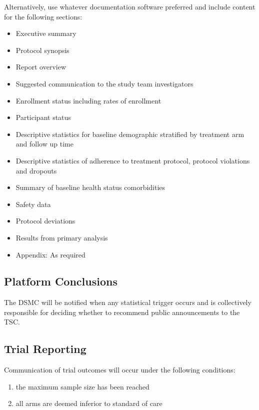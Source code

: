\documentclass[
]{article}
\providecommand{\tightlist}{%
  \setlength{\itemsep}{0pt}\setlength{\parskip}{0pt}}
\begin{document}
Alternatively, use whatever documentation software preferred and include content for the following sections:

\begin{itemize}
\tightlist
\item
  Executive summary
\item
  Protocol synopsis
\item
  Report overview
\item
  Suggested communication to the study team investigators
\item
  Enrollment status including rates of enrollment
\item
  Participant status
\item
  Descriptive statistics for baseline demographic stratified by treatment arm and follow up time
\item
  Descriptive statistics of adherence to treatment protocol, protocol violations and dropouts
\item
  Summary of baseline health status comorbidities
\item
  Safety data
\item
  Protocol deviations
\item
  Results from primary analysis
\item
  Appendix: As required
\end{itemize}


\hypertarget{platform-conclusions}{%
\subsection{Platform Conclusions}\label{platform-conclusions}}

The DSMC will be notified when any statistical trigger occurs and is collectively responsible for deciding whether to recommend public announcements to the TSC.

\hypertarget{trial-reporting}{%
\subsection{Trial Reporting}\label{trial-reporting}}

Communication of trial outcomes will occur under the following conditions:

\begin{enumerate}
\def\labelenumi{\arabic{enumi}.}
\tightlist
\item
  the maximum sample size has been reached
\item
  all arms are deemed inferior to standard of care
\end{enumerate}
\end{document}
